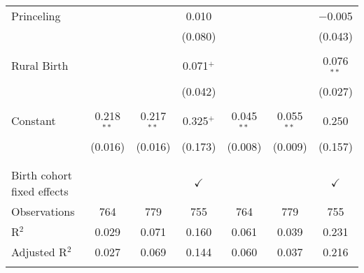 \documentclass[12pt,letterpaper]{article}
\begin{document}
\begin{table}[!htbp]
\begin{tabular}{@{\extracolsep{5pt}}lcccccc}
 Princeling &  &  & 0.010 &  &  & $-$0.005 \\ 
  &  &  & (0.080) &  &  & (0.043) \\ 
  & & & & & & \\ 
 Rural Birth &  &  & 0.071$^{+}$ &  &  & 0.076$^{**}$ \\ 
  &  &  & (0.042) &  &  & (0.027) \\ 
  & & & & & & \\ 
 Constant & 0.218$^{**}$ & 0.217$^{**}$ & 0.325$^{+}$ & 0.045$^{**}$ & 0.055$^{**}$ & 0.250 \\ 
  & (0.016) & (0.016) & (0.173) & (0.008) & (0.009) & (0.157) \\ 
  & & & & & & \\ 
\hline \\[-1.8ex] 
Birth cohort fixed effects &  &  & $\checkmark$ &  &  & $\checkmark$ \\ 
Observations & 764 & 779 & 755 & 764 & 779 & 755 \\ 
R$^{2}$ & 0.029 & 0.071 & 0.160 & 0.061 & 0.039 & 0.231 \\ 
Adjusted R$^{2}$ & 0.027 & 0.069 & 0.144 & 0.060 & 0.037 & 0.216 \\ 
\hline 
\hline \\[-1.8ex] 

\end{tabular} 
\end{table} 
         
\end{document}
